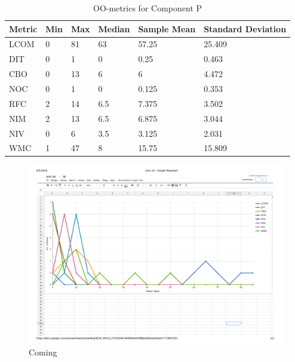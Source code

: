 \begin{table}[]
\centering
\caption{OO-metrics for Component P}
\label{tab:oometrics-proc}
\begin{tabular}{|l|l|l|l|l|l|}
\hline
\textbf{Metric} & \textbf{Min} & \textbf{Max} & \textbf{Median} & \textbf{Sample Mean} & \textbf{Standard Deviation} \\ \hline
LCOM            & 0            & 81           & 63              & 57.25                & 25.409                      \\ \hline
DIT             & 0            & 1            & 0               & 0.25                 & 0.463                       \\ \hline
CBO             & 0            & 13           & 6             & 6                  & 4.472                       \\ \hline
NOC             & 0            & 1            & 0               & 0.125                & 0.353                       \\ \hline
RFC             & 2            & 14           & 6.5             & 7.375                  & 3.502                       \\ \hline
NIM             & 2            & 13           & 6.5             & 6.875                    & 3.044                       \\ \hline
NIV             & 0            & 6            & 3.5             & 3.125                & 2.031                       \\ \hline
WMC            & 1            & 47           & 8               & 15.75                & 15.809                      \\ \hline
\end{tabular}
\end{table}



\begin{landscape}
\setlength\LTleft{-.5in}
	\begin{figure}
	\centering
	\includegraphics[width=\textwidth]{images/pdf/process.pdf}
	\caption{Coming}
	\label{fig:procgraph}
	\end{figure}
\end{landscape}



